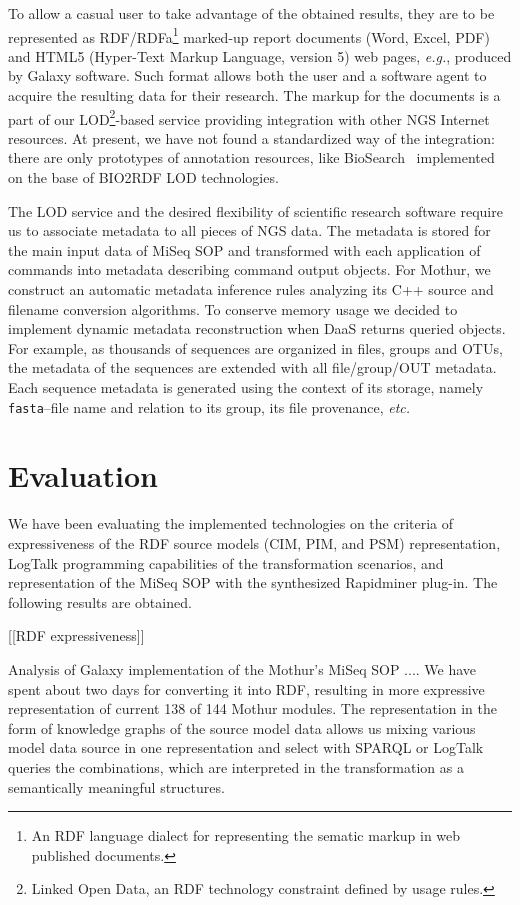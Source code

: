 \documentclass[a4paper]{jpconf}
\begin{document}
To allow a casual user to take advantage of the obtained results, they are to be represented as RDF/RDFa\footnote{An RDF language dialect for representing the sematic markup in web published documents.} marked-up report documents (Word, Excel, PDF) and HTML5 (Hyper-Text Markup Language, version 5) web pages, \emph{e.g.}, produced by Galaxy software.  Such format allows both the user and a software agent to acquire the resulting data for their research.  The markup for the documents is a part of our LOD\footnote{Linked Open Data, an RDF technology constraint defined by usage rules.}-based service providing integration with other NGS Internet resources.  At present, we have not found a standardized way of the integration: there are only prototypes of annotation resources, like BioSearch~\cite{biosearch} implemented on the base of BIO2RDF LOD technologies.

The LOD service and the desired flexibility of scientific research software require us to associate metadata to all pieces of NGS data.  The metadata is stored for the main input data of MiSeq SOP and transformed with each application of commands into metadata describing command output objects.  For Mothur, we construct an automatic metadata inference rules analyzing its C++ source and filename conversion algorithms.  To conserve memory usage we decided to implement dynamic metadata reconstruction when DaaS returns queried objects.  For example, as thousands of sequences are organized in files, groups and OTUs, the metadata of the sequences are extended with all file/group/OUT metadata. Each sequence metadata is generated using the context of its storage, namely \verb|fasta|--file name and relation to its group, its file provenance, \emph{etc.}

\section{Evaluation}\label{sec:eval}

We have been evaluating the implemented technologies on the criteria of expressiveness of the RDF source models (CIM, PIM, and PSM) representation, LogTalk programming capabilities of the transformation scenarios, and representation of the MiSeq SOP with the synthesized Rapidminer plug-in. The following results are obtained.

[[RDF expressiveness]]

Analysis of Galaxy implementation of the Mothur's MiSeq SOP .... We have spent about two days for converting it into RDF, resulting in more expressive representation of current 138 of 144 Mothur modules.  The representation in the form of knowledge graphs of the source model data allows us mixing various model data source in one representation and select with SPARQL or LogTalk queries the combinations, which are interpreted in the transformation as a semantically meaningful structures.  %
\end{document}
